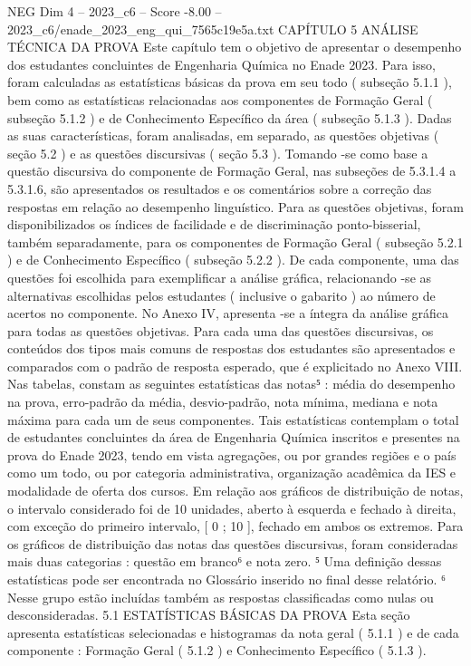 \begin{textsample}{NEG Dim 4 – 2023\_c6 – Score -8.00 – 2023\_c6/enade\_2023\_eng\_qui\_7565c19e5a.txt}  \label{ex:f4_neg_017}
CAPÍTULO 5 ANÁLISE TÉCNICA DA PROVA Este capítulo tem o objetivo de apresentar o desempenho dos estudantes concluintes de Engenharia Química no Enade 2023.
Para isso, foram calculadas as estatísticas básicas da prova em seu todo ( subseção 5.1.1 ), bem como as estatísticas relacionadas aos componentes de Formação Geral ( subseção 5.1.2 ) e de Conhecimento Específico da área ( subseção 5.1.3 ).
Dadas as suas características, foram analisadas, em separado, as questões objetivas ( seção 5.2 ) e as questões discursivas ( seção 5.3 ).
Tomando -se como base a questão discursiva do componente de Formação Geral, nas subseções de 5.3.1.4 a 5.3.1.6, são apresentados os resultados e os comentários sobre a correção das respostas em relação ao desempenho linguístico.
Para as questões objetivas, foram disponibilizados os índices de facilidade e de discriminação ponto-bisserial, também separadamente, para os componentes de Formação Geral ( subseção 5.2.1 ) e de Conhecimento Específico ( subseção 5.2.2 ).
De cada componente, uma das questões foi escolhida para exemplificar a análise gráfica, relacionando -se as alternativas escolhidas pelos estudantes ( inclusive o gabarito ) ao número de acertos no componente.
No Anexo IV, apresenta -se a íntegra da análise gráfica para todas as questões objetivas.
Para cada uma das questões discursivas, os conteúdos dos tipos mais comuns de respostas dos estudantes são apresentados e comparados com o padrão de resposta esperado, que é explicitado no Anexo VIII.
Nas tabelas, constam as seguintes estatísticas das notas⁵ : média do desempenho na prova, erro-padrão da média, desvio-padrão, nota mínima, mediana e nota máxima para cada um de seus componentes.
Tais estatísticas contemplam o total de estudantes concluintes da área de Engenharia Química inscritos e presentes na prova do Enade 2023, tendo em vista agregações, ou por grandes regiões e o país como um todo, ou por categoria administrativa, organização acadêmica da IES e modalidade de oferta dos cursos.
Em relação aos gráficos de distribuição de notas, o intervalo considerado foi de 10 unidades, aberto à esquerda e fechado à direita, com exceção do primeiro intervalo, [ 0 ; 10 ], fechado em ambos os extremos.
Para os gráficos de distribuição das notas das questões discursivas, foram consideradas mais duas categorias : questão em branco⁶ e nota zero. ⁵ Uma definição dessas estatísticas pode ser encontrada no Glossário inserido no final desse relatório. ⁶ Nesse grupo estão incluídas também as respostas classificadas como nulas ou desconsideradas. 5.1 ESTATÍSTICAS BÁSICAS DA PROVA Esta seção apresenta estatísticas selecionadas e histogramas da nota geral ( 5.1.1 ) e de cada componente : Formação Geral ( 5.1.2 ) e Conhecimento Específico ( 5.1.3 ).

\end{textsample}
